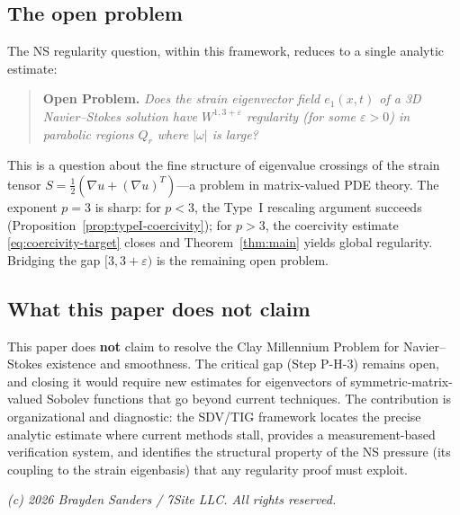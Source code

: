 \documentclass[11pt]{article}
\theoremstyle{definition}
\theoremstyle{remark}
\newcommand{\eps}{\varepsilon}
\begin{document}
\subsection{The open problem}

The NS regularity question, within this framework, reduces to a single
analytic estimate:

\begin{quote}
\textbf{Open Problem.}  \textit{Does the strain eigenvector field
$e_1(x,t)$ of a 3D Navier--Stokes solution have $W^{1,3+\eps}$ regularity
(for some $\eps > 0$) in parabolic regions $Q_r$ where $|\omega|$ is large?}
\end{quote}

\noindent
This is a question about the fine structure of eigenvalue crossings of the
strain tensor $S = \tfrac{1}{2}(\nabla u + (\nabla u)^T)$---a problem in
matrix-valued PDE theory.  The exponent $p = 3$ is sharp: for $p < 3$, the
Type~I rescaling argument succeeds (Proposition~\ref{prop:typeI-coercivity});
for $p > 3$, the coercivity estimate \eqref{eq:coercivity-target} closes and
Theorem~\ref{thm:main} yields global regularity.  Bridging the gap $[3, 3+\eps)$
is the remaining open problem.

\subsection{What this paper does not claim}

This paper does \textbf{not} claim to resolve the Clay Millennium Problem for
Navier--Stokes existence and smoothness.  The critical gap (Step P-H-3) remains
open, and closing it would require new estimates for eigenvectors of
symmetric-matrix-valued Sobolev functions that go beyond current techniques.
The contribution is organizational and diagnostic: the SDV/TIG framework locates
the precise analytic estimate where current methods stall, provides a
measurement-based verification system, and identifies the structural property
of the NS pressure (its coupling to the strain eigenbasis) that any regularity
proof must exploit.

\medskip
\noindent\textit{(c) 2026 Brayden Sanders / 7Site LLC.  All rights reserved.}

\end{document}
